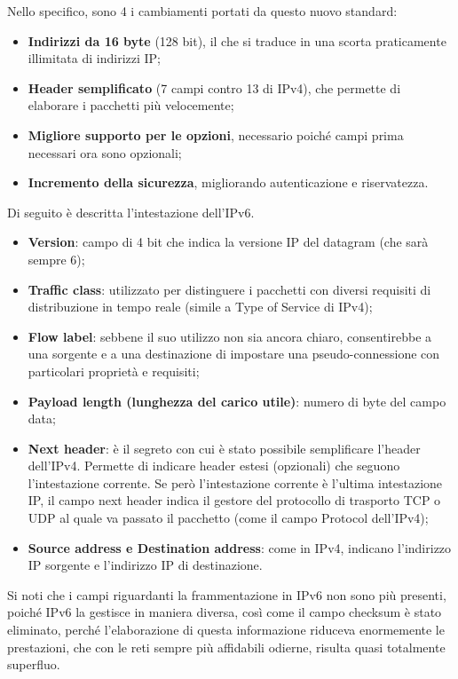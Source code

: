             Nello specifico, sono 4 i cambiamenti portati da questo nuovo standard:
            \begin{itemize}
                \item \textbf{Indirizzi da 16 byte} (128 bit), il che si traduce in una scorta praticamente illimitata di
                indirizzi IP;
                \item \textbf{Header semplificato} (7 campi contro 13 di IPv4), che permette di elaborare i pacchetti
                più velocemente;
                \item \textbf{Migliore supporto per le opzioni}, necessario poiché campi prima necessari ora sono
                opzionali;
                \item \textbf{Incremento della sicurezza}, migliorando autenticazione e riservatezza.                
            \end{itemize}
            Di seguito è descritta l’intestazione dell’IPv6.

            
            \begin{itemize}
                \item \textbf{Version}: campo di 4 bit che indica la versione IP del datagram (che sarà sempre 6);
                \item \textbf{Traffic class}: utilizzato per distinguere i pacchetti con diversi requisiti di distribuzione
                in tempo reale (simile a Type of Service di IPv4);
                \item \textbf{Flow label}: sebbene il suo utilizzo non sia ancora chiaro, consentirebbe a una sorgente e
                a una destinazione di impostare una pseudo-connessione con particolari proprietà e
                requisiti;
                \item \textbf{Payload length (lunghezza del carico utile)}: numero di byte del campo data;
                \item \textbf{Next header}: è il segreto con cui è stato possibile semplificare l’header dell’IPv4.
                Permette di indicare header estesi (opzionali) che seguono l’intestazione corrente. Se
                però l’intestazione corrente è l’ultima intestazione IP, il campo next header indica il
                gestore del protocollo di trasporto TCP o UDP al quale va passato il pacchetto (come il
                campo Protocol dell’IPv4);
                \item \textbf{Source address e Destination address}: come in IPv4, indicano l’indirizzo IP sorgente e
                l’indirizzo IP di destinazione.
                
            \end{itemize}
            Si noti che i campi riguardanti la frammentazione in IPv6 non sono più presenti, poiché IPv6
            la gestisce in maniera diversa, così come il campo checksum è stato eliminato, perché
            l’elaborazione di questa informazione riduceva enormemente le prestazioni, che con le reti
            sempre più affidabili odierne, risulta quasi totalmente superfluo.

